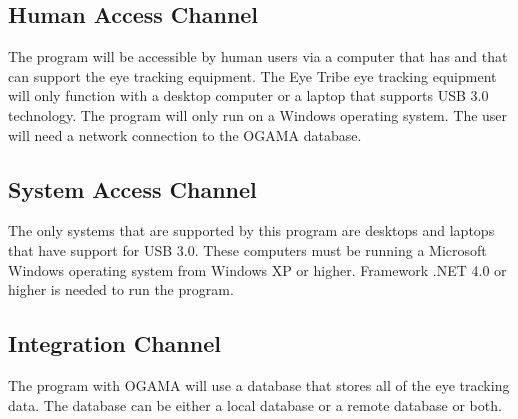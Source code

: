

\subsection{Human Access Channel}
    The program will be accessible by human users via a computer that has and that can support the eye tracking equipment. The Eye Tribe eye tracking equipment will only function with a desktop computer or a laptop that supports USB 3.0 technology. The program will only run on a Windows operating system. The user will need a network connection to the OGAMA database.
\subsection{System Access Channel}
    The only systems that are supported by this program are desktops and laptops that have support for USB 3.0. These computers must be running a Microsoft Windows operating system from Windows XP or higher. Framework .NET 4.0 or higher is needed to run the program.
\subsection{Integration Channel}
    The program with OGAMA will use a database that stores all of the eye tracking data. The database can be either a local database or a remote database or both.
